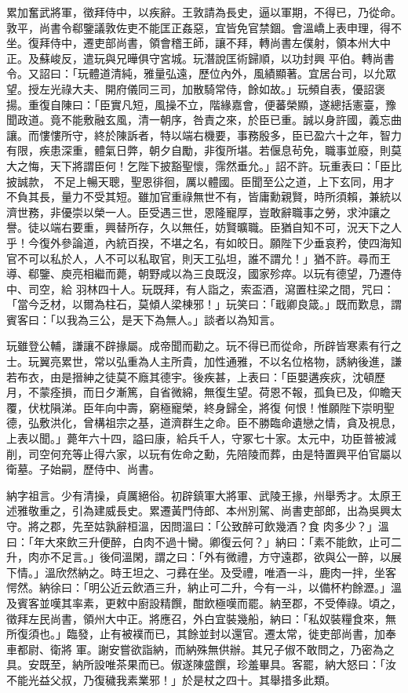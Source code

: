 \begin{pinyinscope}
 累加奮武將軍，徵拜侍中，以疾辭。王敦請為長史，逼以軍期，不得已，乃從命。敦平，尚書令郗鑒議敦佐吏不能匡正姦惡，宜皆免官禁錮。會溫嶠上表申理，得不坐。復拜侍中，遷吏部尚書，領會稽王師，讓不拜，轉尚書左僕射，領本州大中正。及蘇峻反，遣玩與兄曄俱守宮城。玩潛說匡術歸順，以功封興
 平伯。轉尚書令。又詔曰：「玩體道清純，雅量弘遠，歷位內外，風績顯著。宜居台司，以允眾望。授左光祿大夫、開府儀同三司，加散騎常侍，餘如故。」玩頻自表，優詔褒揚。重復自陳曰：「臣實凡短，風操不立，階緣嘉會，便蕃榮顯，遂總括憲臺，豫聞政道。竟不能敷融玄風，清一朝序，咎責之來，於臣已重。誠以身許國，義忘曲讓。而慺慺所守，終於陳訴者，特以端右機要，事務殷多，臣已盈六十之年，智力有限，疾患深重，體氣日弊，朝夕自勵，非復所堪。若偃息茍免，職事並廢，則莫大之悔，天下將謂臣何！乞陛下披豁聖懷，霈然垂允。」詔不許。玩重表曰：「臣比披誠款，
 不足上暢天聰，聖恩徘徊，厲以體國。臣聞至公之道，上下玄同，用才不負其長，量力不受其短。雖加官重祿無世不有，皆庸勳親賢，時所須賴，兼統以濟世務，非優崇以榮一人。臣受遇三世，恩隆寵厚，豈敢辭職事之勞，求沖讓之譽。徒以端右要重，興替所存，久以無任，妨賢曠職。臣猶自知不可，況天下之人乎！今復外參論道，內統百揆，不堪之名，有如皎日。願陛下少垂哀矜，使四海知官不可以私於人，人不可以私取官，則天工弘坦，誰不謂允！」猶不許。尋而王導、郗鑒、庾亮相繼而薨，朝野咸以為三良既沒，國家殄瘁。以玩有德望，乃遷侍中、司空，給
 羽林四十人。玩既拜，有人詣之，索盃酒，瀉置柱梁之間，咒曰：「當今乏材，以爾為柱石，莫傾人梁棟邪！」玩笑曰：「戢卿良箴。」既而歎息，謂賓客曰：「以我為三公，是天下為無人。」談者以為知言。



 玩雖登公輔，謙讓不辟掾屬。成帝聞而勸之。玩不得已而從命，所辟皆寒素有行之士。玩翼亮累世，常以弘重為人主所貴，加性通雅，不以名位格物，誘納後進，謙若布衣，由是搢紳之徒莫不廕其德宇。後疾甚，上表曰：「臣嬰遘疾疢，沈頓歷月，不蒙痊損，而日夕漸篤，自省微綿，無復生望。荷恩不報，孤負已及，仰瞻天覆，伏枕隕涕。臣年向中壽，窮極寵榮，終身歸全，將復
 何恨！惟願陛下崇明聖德，弘敷洪化，曾構祖宗之基，道濟群生之命。臣不勝臨命遺戀之情，貪及視息，上表以聞。」薨年六十四，謚曰康，給兵千人，守冢七十家。太元中，功臣普被減削，司空何充等止得六家，以玩有佐命之勳，先陪陵而葬，由是特置興平伯官屬以衛墓。子始嗣，歷侍中、尚書。



 納字祖言。少有清操，貞厲絕俗。初辟鎮軍大將軍、武陵王掾，州舉秀才。太原王述雅敬重之，引為建威長史。累遷黃門侍郎、本州別駕、尚書吏部郎，出為吳興太守。將之郡，先至姑孰辭桓溫，因問溫曰：「公致醉可飲幾酒？食
 肉多少？」溫曰：「年大來飲三升便醉，白肉不過十臠。卿復云何？」納曰：「素不能飲，止可二升，肉亦不足言。」後伺溫閑，謂之曰：「外有微禮，方守遠郡，欲與公一醉，以展下情。」溫欣然納之。時王坦之、刁彞在坐。及受禮，唯酒一斗，鹿肉一拌，坐客愕然。納徐曰：「明公近云飲酒三升，納止可二升，今有一斗，以備杯杓餘瀝。」溫及賓客並嘆其率素，更敕中廚設精饌，酣飲極嘆而罷。納至郡，不受俸祿。頃之，徵拜左民尚書，領州大中正。將應召，外白宜裝幾船，納曰：「私奴裝糧食來，無所復須也。」臨發，止有被襆而已，其餘並封以還官。遷太常，徙吏部尚書，加奉車都尉、衛將
 軍。謝安嘗欲詣納，而納殊無供辦。其兄子俶不敢問之，乃密為之具。安既至，納所設唯茶果而已。俶遂陳盛饌，珍羞畢具。客罷，納大怒曰：「汝不能光益父叔，乃復穢我素業邪！」於是杖之四十。其舉措多此類。




\end{pinyinscope}
